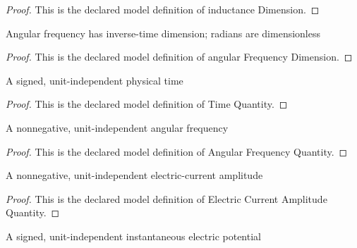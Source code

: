 \begin{proof}
  This is the declared model definition of inductance Dimension.
\end{proof}
\begin{definition}
  \label{def:physics:phyx-mini-0888:phyxminiproblems-problemphyxmini0888-angularfrequencydimension}
  Angular frequency has inverse-time dimension; radians are dimensionless
\end{definition}
\begin{proof}
  This is the declared model definition of angular Frequency Dimension.
\end{proof}
\begin{definition}
  \label{def:physics:phyx-mini-0888:phyxminiproblems-problemphyxmini0888-timequantity}
  A signed, unit-independent physical time
\end{definition}
\begin{proof}
  This is the declared model definition of Time Quantity.
\end{proof}
\begin{definition}
  \label{def:physics:phyx-mini-0888:phyxminiproblems-problemphyxmini0888-angularfrequencyquantity}
  A nonnegative, unit-independent angular frequency
\end{definition}
\begin{proof}
  This is the declared model definition of Angular Frequency Quantity.
\end{proof}
\begin{definition}
  \label{def:physics:phyx-mini-0888:phyxminiproblems-problemphyxmini0888-electriccurrentamplitudequantity}
  A nonnegative, unit-independent electric-current amplitude
\end{definition}
\begin{proof}
  This is the declared model definition of Electric Current Amplitude Quantity.
\end{proof}
\begin{definition}
  \label{def:physics:phyx-mini-0888:phyxminiproblems-problemphyxmini0888-electricpotentialquantity}
  A signed, unit-independent instantaneous electric potential
\end{definition}

